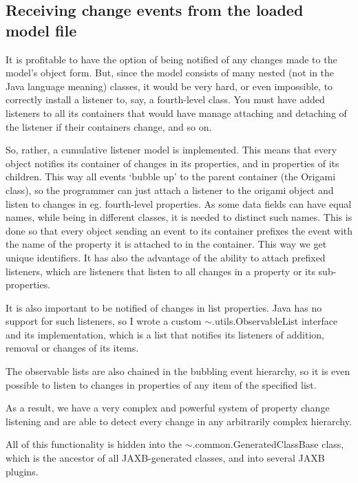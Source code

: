 \subsection{Receiving change events from the loaded model file}
It is profitable to have the option of being notified of any changes made to the model's object form. But, since the model consists of many nested (not in the Java language meaning) classes, it would be very hard, or even impossible, to correctly install a listener to, say, a fourth-level class. You must have added listeners to all its containers that would have manage attaching and detaching of the listener if their containers change, and so on. 

So, rather, a cumulative listener model is implemented. This means that every object notifies its container of changes in its properties, and in properties of its children. This way all events `bubble up' to the parent container (the Origami class), so the programmer can just attach a listener to the origami object and listen to changes in eg. fourth-level properties. As some data fields can have equal names, while being in different classes, it is needed to distinct such names. This is done so that every object sending an event to its container prefixes the event with the name of the property it is attached to in the container. This way we get unique identifiers. It has also the advantage of the ability to attach prefixed listeners, which are listeners that listen to all changes in a property or its sub-properties.

It is also important to be notified of changes in list properties. Java has no support for such listeners, so I wrote a custom $\sim$.utils.ObservableList interface and its implementation, which is a list that notifies its listeners of addition, removal or changes of its items. 

The observable lists are also chained in the bubbling event hierarchy, so it is even possible to listen to changes in properties of any item of the specified list.

As a result, we have a very complex and powerful system of property change listening and are able to detect every change in any arbitrarily complex hierarchy.

All of this functionality is hidden into the $\sim$.common.GeneratedClassBase class, which is the ancestor of all JAXB-generated classes, and into several JAXB plugins.


